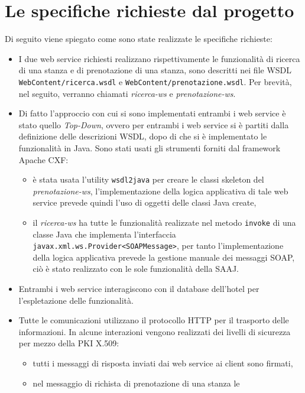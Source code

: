 \documentclass[a4paper]{article}
\begin{document}
\section{Le specifiche richieste dal progetto}
Di seguito viene spiegato come sono state realizzate le specifiche
richieste:
\begin{itemize}
\item I due web service richiesti realizzano rispettivamente le
  funzionalit\`a di ricerca di una stanza e di prenotazione di una
  stanza, sono descritti nei file WSDL \verb'WebContent/ricerc'\-\verb'a.wsdl'
  e \verb'WebContent/prenotazione.wsdl'. Per brevit\`a, nel seguito,
  verranno chiamati \emph{ricerca-ws} e \emph{prenotazione-ws}.
\item Di fatto l'approccio con cui si sono implementati entrambi i web
  service \`e stato quello \emph{Top-Down}, ovvero per entrambi i web
  service si \`e partiti dalla definizione delle descrizioni WSDL,
  dopo di che si \`e implementato le funzionalit\`a in Java. Sono
  stati usati gli strumenti forniti dal framework Apache CXF:
  \begin{itemize}
    \item \`e stata usata l'utility \verb'wsdl2java' per creare le
      classi skeleton del \emph{prenotazione-ws}, l'implementazione
      della logica applicativa di tale web service prevede quindi
      l'uso di oggetti delle classi Java create,
    \item il \emph{ricerca-ws} ha tutte le funzionalit\`a realizzate
      nel metodo \verb'invoke' di una classe Java che implementa
      l'interfaccia \verb'javax.xml.ws.Provider<SOAPMessage>', per
      tanto l'implementazione della logica applicativa prevede la
      gestione manuale dei messaggi SOAP, ci\`o \`e stato realizzato
      con le sole funzionalit\`a della SAAJ.
  \end{itemize}
\item Entrambi i web service interagiscono con il database
  dell'hotel per l'espletazione delle funzionalit\`a.
\item Tutte le comunicazioni utilizzano il protocollo HTTP per il
  trasporto delle informazioni. In alcune interazioni vengono
  realizzati dei livelli di sicurezza per mezzo della PKI X.509:
  \begin{itemize}
  \item tutti i messaggi di risposta inviati dai web service ai
    client sono firmati,
  \item nel messaggio di richista di prenotazione di una stanza le

\end{itemize}
\end{itemize}
\end{document}
